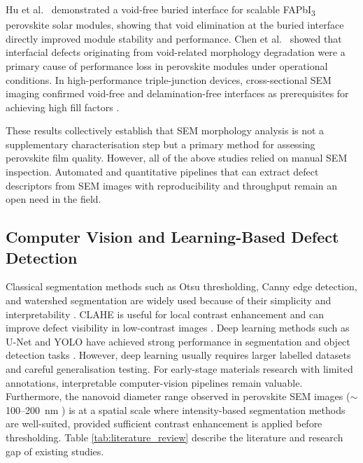 \documentclass[pdflatex,sn-mathphys-num,iicol]{sn-jnl}
\theoremstyle{thmstyleone}
\theoremstyle{thmstyletwo}
\theoremstyle{thmstylethree}
\begin{document}
Hu et al.\ \cite{hu2023} demonstrated a void-free buried interface
for scalable FAPbI\textsubscript{3} perovskite solar modules, showing
that void elimination at the buried interface directly improved module
stability and performance. Chen et al.\ \cite{chen2021} showed that
interfacial defects originating from void-related morphology
degradation were a primary cause of performance loss in perovskite
modules under operational conditions. In high-performance
triple-junction devices, cross-sectional SEM imaging confirmed
void-free and delamination-free interfaces as prerequisites for
achieving high fill factors \cite{zheng2025}.

These results collectively establish that SEM morphology analysis is
not a supplementary characterisation step but a primary method for
assessing perovskite film quality. However, all of the above studies
relied on manual SEM inspection. Automated and quantitative pipelines
that can extract defect descriptors from SEM images with
reproducibility and throughput remain an open need in the field.

\subsection{Computer Vision and Learning-Based Defect Detection}
\label{subsec:cv_related_work}

Classical segmentation methods such as Otsu thresholding, Canny edge
detection, and watershed segmentation are widely used because of
their simplicity and interpretability
\cite{otsu1979,canny1986,vincent1991}. CLAHE is useful for local
contrast enhancement and can improve defect visibility in
low-contrast images \cite{zuiderveld1994}. Deep learning methods such
as U-Net and YOLO have achieved strong performance in segmentation
and object detection tasks \cite{ronneberger2015,redmon2016}.
However, deep learning usually requires larger labelled datasets and
careful generalisation testing. For early-stage materials research
with limited annotations, interpretable computer-vision pipelines
remain valuable. Furthermore, the nanovoid diameter range observed
in perovskite SEM images ($\sim$100--200~nm \cite{chang2026}) is at
a spatial scale where intensity-based segmentation methods are
well-suited, provided sufficient contrast enhancement is applied
before thresholding. Table \ref{tab:literature_review} describe the   literature and research gap of existing studies.

\end{document}
